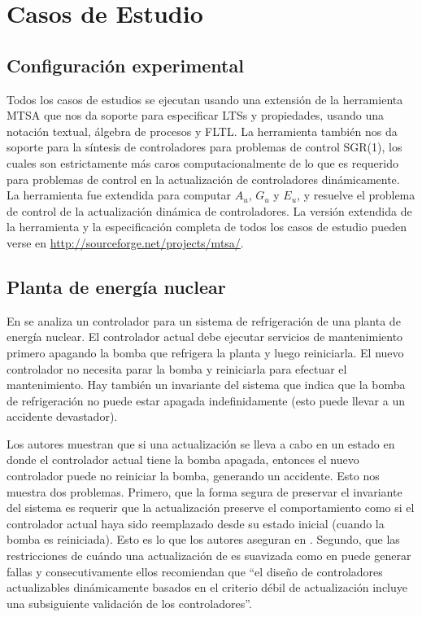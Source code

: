 \section{Casos de Estudio}
\label{cases_of_study}

\subsection*{Configuración experimental}

Todos los casos de estudios se ejecutan usando una extensión de la herramienta MTSA \cite{4639371} que nos da soporte
para especificar LTSs y propiedades, usando una notación textual, álgebra de procesos y FLTL. La herramienta también nos 
da soporte para la síntesis de controladores para problemas de control SGR(1), los cuales son estrictamente más caros computacionalmente de lo
que es requerido para problemas de control en la actualización de controladores dinámicamente. La herramienta fue 
extendida para computar $A_u$, $G_u$ y $E_u$, y resuelve el problema de control de la actualización
dinámica de controladores. La versión extendida de la herramienta y la especificación completa de todos los casos de
estudio pueden verse en \url{http://sourceforge.net/projects/mtsa/}.

\subsection{Planta de energía nuclear}
\label{power_plant}

En \cite{PanzicaLaManna:2013:FCC:2487336.2487349} se analiza un controlador para un sistema de refrigeración de una
planta de energía nuclear. El controlador actual debe ejecutar servicios de mantenimiento primero apagando la
bomba que refrigera la planta y luego reiniciarla. El nuevo controlador no necesita parar la bomba y reiniciarla para
efectuar el mantenimiento. Hay también un invariante del sistema que indica que la bomba de refrigeración no puede estar
apagada indefinidamente (esto puede llevar a un accidente devastador). 

Los autores muestran que si una actualización se lleva a cabo en un estado en donde el controlador actual tiene la bomba
apagada, entonces el nuevo controlador puede no reiniciar la bomba, generando un accidente. Esto nos muestra dos
problemas. Primero, que la forma segura de preservar el invariante del sistema es requerir que la actualización preserve
el comportamiento como si el controlador actual haya sido reemplazado desde su estado inicial (cuando la bomba es
reiniciada). Esto es lo que los autores aseguran en \cite{6224401}. Segundo, que las restricciones de cuándo una
actualización de \cite{6224401} es suavizada como en \cite{PanzicaLaManna:2013:FCC:2487336.2487349}  puede generar
fallas y consecutivamente ellos recomiendan que ``el diseño de controladores actualizables dinámicamente basados en el
criterio débil de  actualización incluye una subsiguiente validación de los controladores''.


